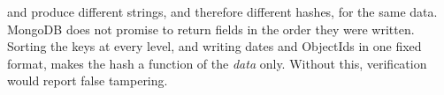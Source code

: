 \begin{howto}
 and  produce
different strings, and therefore different hashes, for the same data. MongoDB
does not promise to return fields in the order they were written. Sorting the
keys at every level, and writing dates and ObjectIds in one fixed format, makes
the hash a function of the \emph{data} only. Without this, verification would
report false tampering.
\end{howto}
